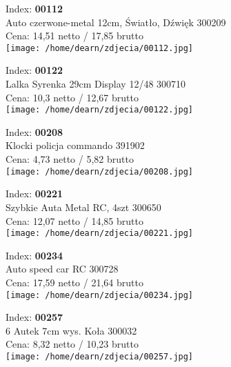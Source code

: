 {Index: \textbf{00112}\\
Auto czerwone-metal 12cm, Światło, Dźwięk 300209\\
Cena: 14,51 netto / 17,85 brutto\\
  \texttt{[image: /home/dearn/zdjecia/00112.jpg]}}\newline\newline

{Index: \textbf{00122}\\
Lalka Syrenka 29cm Display 12/48 300710\\
Cena: 10,3 netto / 12,67 brutto\\
  \texttt{[image: /home/dearn/zdjecia/00122.jpg]}}\newline\newline

{Index: \textbf{00208}\\
Klocki policja commando 391902\\
Cena: 4,73 netto / 5,82 brutto\\
  \texttt{[image: /home/dearn/zdjecia/00208.jpg]}}\newline\newline

{Index: \textbf{00221}\\
Szybkie Auta Metal RC, 4szt 300650\\
Cena: 12,07 netto / 14,85 brutto\\
  \texttt{[image: /home/dearn/zdjecia/00221.jpg]}}\newline\newline

{Index: \textbf{00234}\\
Auto speed car RC 300728\\
Cena: 17,59 netto / 21,64 brutto\\
  \texttt{[image: /home/dearn/zdjecia/00234.jpg]}}\newline\newline

{Index: \textbf{00257}\\
6 Autek 7cm wys. Koła 300032\\
Cena: 8,32 netto / 10,23 brutto\\
  \texttt{[image: /home/dearn/zdjecia/00257.jpg]}}\newline\newline

